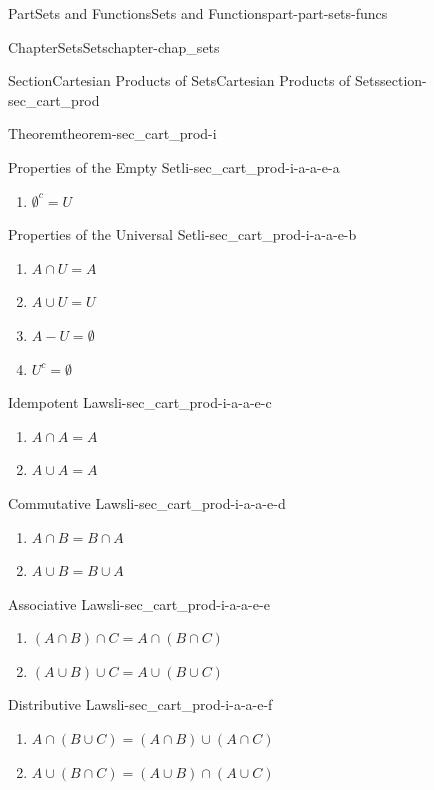 \documentclass[oneside,10pt,]{book}
\numberwithin{equation}{chapter}
\begin{document}
\begin{partptx}{Part}{Sets and Functions}{}{Sets and Functions}{}{}{part-part-sets-funcs}
\begin{chapterptx}{Chapter}{Sets}{}{Sets}{}{}{chapter-chap_sets}
\begin{sectionptx}{Section}{Cartesian Products of Sets}{}{Cartesian Products of Sets}{}{}{section-sec_cart_prod}
\begin{theorem}{Theorem}{}{}{theorem-sec_cart_prod-i}
\begin{descriptionlist}
\begin{dlinarrow}{Properties of the Empty Set}{li-sec_cart_prod-i-a-a-e-a}
\begin{enumerate}[label=\roman*]
\item{}\(\displaystyle \emptyset^c = U\)%
\end{enumerate}
%
\end{dlinarrow}%
\begin{dlinarrow}{Properties of the Universal Set}{li-sec_cart_prod-i-a-a-e-b}%
%
\begin{enumerate}[label=\roman*]
\item{}\(\displaystyle A \cap U = A\)%
\item{}\(\displaystyle A \cup U = U\)%
\item{}\(\displaystyle A-U = \emptyset\)%
\item{}\(\displaystyle U^c = \emptyset\)%
\end{enumerate}
%
\end{dlinarrow}%
\begin{dlinarrow}{Idempotent Laws}{li-sec_cart_prod-i-a-a-e-c}%
%
\begin{enumerate}[label=\roman*]
\item{}\(\displaystyle A \cap A = A\)%
\item{}\(\displaystyle A \cup A = A\)%
\end{enumerate}
%
\end{dlinarrow}%
\begin{dlinarrow}{Commutative Laws}{li-sec_cart_prod-i-a-a-e-d}%
%
\begin{enumerate}[label=\roman*]
\item{}\(\displaystyle A \cap B = B \cap A\)%
\item{}\(\displaystyle A \cup B = B \cup A\)%
\end{enumerate}
%
\end{dlinarrow}%
\begin{dlinarrow}{Associative Laws}{li-sec_cart_prod-i-a-a-e-e}%
%
\begin{enumerate}[label=\roman*]
\item{}\(\displaystyle (A \cap B) \cap C = A \cap (B \cap C)\)%
\item{}\(\displaystyle (A \cup B) \cup C = A \cup (B \cup C)\)%
\end{enumerate}
%
\end{dlinarrow}%
\begin{dlinarrow}{Distributive Laws}{li-sec_cart_prod-i-a-a-e-f}%
%
\begin{enumerate}[label=\roman*]
\item{}\(\displaystyle A \cap (B \cup C) = (A \cap B) \cup (A \cap C)\)%
\item{}\(\displaystyle A \cup (B \cap C) = (A \cup B) \cap (A \cup C)\)%

\end{enumerate}
\end{dlinarrow}
\end{descriptionlist}
\end{theorem}
\end{sectionptx}
\end{chapterptx}
\end{partptx}
\end{document}
